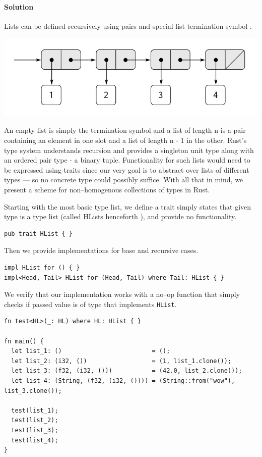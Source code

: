 \paragraph{Solution}

Lists can be defined recursively using pairs and special list termination symbol \cite{structureandinterpretation}.

\includegraphics[width=\textwidth]{figures/lisp-list.png}

An empty list is simply the termination symbol and a list of length n is a pair containing an element in one slot and a list of length n - 1 in the other.
Rust's type system understands recursion and provides a singleton unit type along with an ordered pair type - a binary tuple.
Functionality for such lists would need to be expressed using traits since our very goal is to abstract over lists of different types --- so no concrete type could possibly suffice.
With all that in mind, we present a scheme for non--homogenous collections of types in Rust.

Starting with the most basic type list, we define a trait simply states that given type is a type list (called HLists henceforth \cite{frunk}), and provide no functionality.

\begin{lstlisting}
pub trait HList { }
\end{lstlisting}

Then we provide implementations for base and recursive cases.

\begin{lstlisting}
impl HList for () { }
impl<Head, Tail> HList for (Head, Tail) where Tail: HList { }
\end{lstlisting}

We verify that our implementation works with a no--op function that simply checks if passed value is of type that implements \texttt{HList}.

\begin{lstlisting}[basicstyle=\tiny]
fn test<HL>(_: HL) where HL: HList { }

fn main() {
  let list_1: ()                         = ();
  let list_2: (i32, ())                  = (1, list_1.clone());
  let list_3: (f32, (i32, ()))           = (42.0, list_2.clone());
  let list_4: (String, (f32, (i32, ()))) = (String::from("wow"), list_3.clone());

  test(list_1);
  test(list_2);
  test(list_3);
  test(list_4);
}
\end{lstlisting}

